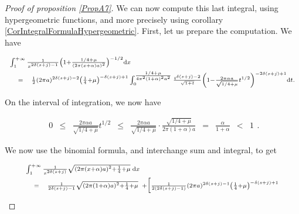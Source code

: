 \documentclass{jams-l}
\theoremstyle{definition}
\theoremstyle{remark}
\numberwithin{equation}{section}
\begin{document}
\begin{proof}[Proof of proposition \ref{PropA7}]
                \noindent We can now compute this last integral, using hypergeometric functions, and more precisely using corollary \ref{CorIntegralFormulaHypergeometric}. First, let us prepare the computation. We have
                
                \[ \begin{array}{lll}
                        \multicolumn{3}{l}{\scriptstyle \int_1^{+ \infty} \frac{1}{x^{2 \delta \left( s + j \right) - 1}} \left( 1 + \frac{1/4 + \mu}{\left( 2 \pi \left( x + \alpha \right) a \right)^2} \right)^{-1/2} \mathrm{d}x} \\[0.5em]
                        
                        & \scriptstyle = & \scriptstyle \frac{1}{2} \left( 2 \pi a \right)^{2 \delta \left( s + j \right) - 2} \left( \frac{1}{4} + \mu \right)^{- \delta \left( s + j \right) + 1} \int_0^{\frac{1/4 + \mu}{4 \pi^2 \left( 1 + \alpha \right)^2 a^2}} \frac{t^{\delta \left( s + j \right) - 2}}{\sqrt{1 + t}} \left( 1 - \frac{2 \pi \alpha a}{\sqrt{1/4 + \mu}} t^{1/2} \right)^{- 2 \delta \left( s + j \right) + 1} \mathrm{d}t.
                    \end{array} \]
                
                \noindent On the interval of integration, we now have
                
                \[ \begin{array}{lllllllll}
                        0 & \leqslant & \frac{2 \pi \alpha a}{\sqrt{1/4 + \mu}} t^{1/2} & \leqslant & \frac{2 \pi \alpha a}{\sqrt{1/4 + \mu}} \cdot \frac{\sqrt{1/4 + \mu}}{2 \pi \left( 1 + \alpha \right) a} & = & \frac{\alpha}{1 + \alpha} & < & 1
                    \end{array} . \]
                
                \noindent We now use the binomial formula, and interchange sum and integral, to get
                
                \begin{equation}
                \label{EqA7Ramanujan-01}
                    \begin{array}{lll}
                        \multicolumn{3}{l}{\scriptstyle \scriptstyle \int_1^{+ \infty} \frac{1}{x^{2 \delta \left( s+j \right)}} \sqrt{\left( 2 \pi \left( x + \alpha \right) a \right)^2 + \frac{1}{4} + \mu} \; \mathrm{d}x} \\[0.5em]
                        
                        & \scriptstyle = & \scriptstyle \frac{1}{2 \delta \left( s + j \right) - 1} \sqrt{\left( 2 \pi \left( 1 + \alpha \right) a \right)^2 + \frac{1}{4} + \mu} \; \; + \Big[ \frac{1}{2 \left( 2 \delta \left( s + j \right) - 1 \right)} \left( 2 \pi a \right)^{2 \delta \left( s + j \right) - 1} \left( \frac{1}{4} + \mu \right)^{- \delta \left( s + j \right) + 1} \\[0.5em]
                        

\end{array}
\end{equation}
\end{proof}
\end{document}
